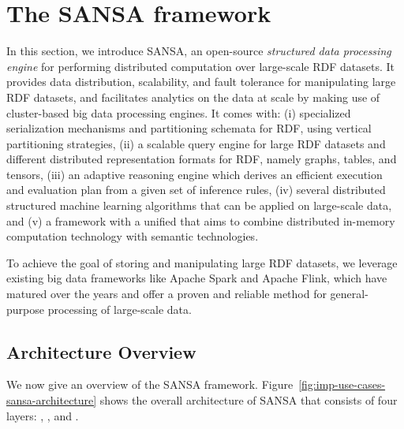 \section{The SANSA framework}
\label{sec:the-sansa-framework}
In this section, we introduce SANSA, an open-source \emph{structured data processing engine} for performing distributed computation over large-scale \gls{RDF} datasets.
It provides data distribution, scalability, and fault tolerance for manipulating large \gls{RDF} datasets, and facilitates analytics on the data at scale by making use of cluster-based big data processing engines.
It comes with: (i) specialized serialization mechanisms and partitioning schemata for \gls{RDF}, using vertical partitioning strategies,
(ii) a scalable query engine for large \gls{RDF} datasets and different distributed representation formats for \gls{RDF}, namely graphs, tables, and tensors,
(iii) an adaptive reasoning engine which derives an efficient execution and evaluation plan from a given set of inference rules,
(iv) several distributed structured machine learning algorithms that can be applied on large-scale  data,
and (v) a framework with a unified  that aims to combine distributed in-memory computation technology with semantic technologies.

To achieve the goal of storing and manipulating large \gls{RDF} datasets, we leverage existing big data frameworks like Apache Spark and Apache Flink, which have matured over the years and offer a proven and reliable method for general-purpose processing of large-scale data.

\subsection{Architecture Overview}
\label{sec:sansa-architecture}

We now give an overview of the SANSA framework.
Figure~\ref{fig:imp-use-cases-sansa-architecture} shows the overall architecture of SANSA that consists of four layers: , ,  and .

